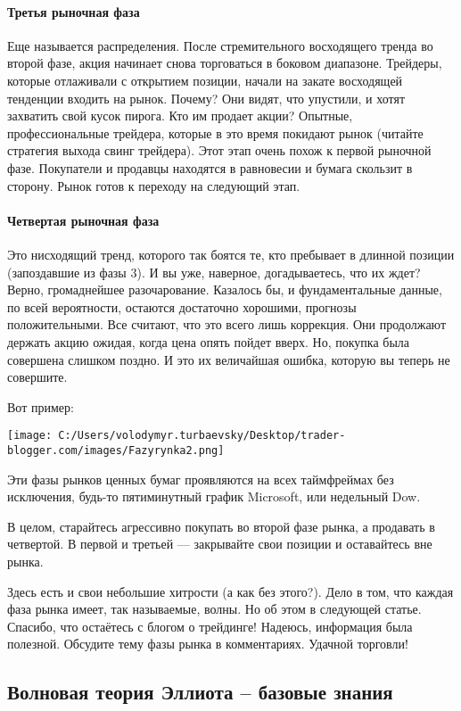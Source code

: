 \documentclass[a5paper]{article}
\begin{document}
\paragraph{Третья рыночная фаза}

Еще называется распределения. После стремительного восходящего тренда
во второй фазе, акция начинает снова торговаться в боковом диапазоне.
Трейдеры, которые отлаживали с открытием позиции, начали на закате
восходящей тенденции входить на рынок. Почему? Они видят, что
упустили, и хотят захватить свой кусок пирога. Кто им продает акции?
Опытные, профессиональные трейдера, которые в это время покидают рынок
(читайте стратегия выхода свинг трейдера). Этот этап очень похож к
первой рыночной фазе. Покупатели и продавцы находятся в равновесии и
бумага скользит в сторону. Рынок готов к переходу на следующий этап.

\paragraph{Четвертая рыночная фаза}

Это нисходящий тренд, которого так боятся те, кто пребывает в длинной позиции (запоздавшие из фазы 3). И вы уже, наверное, догадываетесь, что их ждет? Верно, громаднейшее разочарование. Казалось бы, и фундаментальные данные, по всей вероятности, остаются достаточно хорошими, прогнозы положительными. Все считают, что это всего лишь коррекция. Они продолжают держать акцию ожидая, когда цена опять пойдет вверх. Но, покупка была совершена слишком поздно. И это их величайшая ошибка, которую вы теперь не совершите.

Вот пример:

\texttt{[image: C:/Users/volodymyr.turbaevsky/Desktop/trader-blogger.com/images/Fazyrynka2.png]}

Эти фазы рынков ценных бумаг проявляются на всех таймфреймах без исключения, будь-то пятиминутный график Microsoft, или недельный Dow.

В целом, старайтесь агрессивно покупать во второй фазе рынка, а продавать в четвертой. В первой и третьей — закрывайте свои позиции и оставайтесь вне рынка.

Здесь есть и свои небольшие хитрости (а как без этого?). Дело в том,
что каждая фаза рынка имеет, так называемые, волны. Но об этом в
следующей статье. Спасибо, что остаётесь с блогом о трейдинге!
Надеюсь, информация была полезной. Обсудите тему фазы рынка в
комментариях. Удачной торговли!

\subsection{Волновая теория Эллиота – базовые знания}
\end{document}
